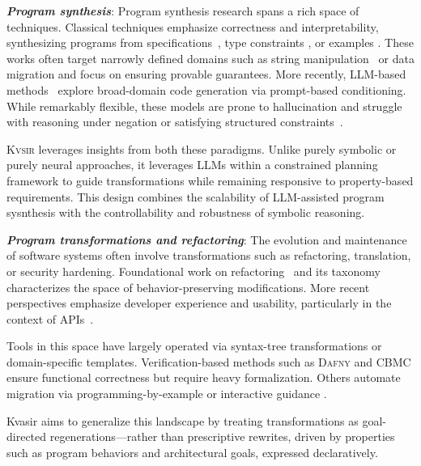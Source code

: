 \documentclass[sigplan]{acmart}
\newcommand{\sys}{{\scshape Kv{\textalpha}sir}\xspace}
\newcommand{\heading}[1]{\vspace{2pt}\noindent\textbf{\emph{#1}}:\enspace}
\begin{document}
\heading{Program synthesis}
Program synthesis research spans a rich space of techniques.
Classical techniques emphasize correctness and
interpretability, synthesizing programs from specifications~\cite{alur2013syntax, feser2015synthesizing, gulwani2011automating},
type constraints \cite{polikarpova2016program},
or examples \cite{jha2010oracle, raza2018disjunctive, singh2016blinkfill}.
These works often target narrowly
defined domains such as string manipulation~\cite{harp:ccs:2021} or data migration
\cite{yaghmazadeh2018automated} and focus on ensuring provable guarantees.
More recently, LLM-based methods~\cite{austin2021program, chen2021evaluating}
explore broad-domain code generation via prompt-based conditioning.
While remarkably flexible, these models are prone to hallucination and struggle
with reasoning under negation or satisfying structured constraints~\cite{xu2023llmfoolitselfpromptbased, wu2023deceptpromptexploitingllmdrivencode,jiang2024llmsdreamelephantswhen,hwang2024thinkpinkelephant}.

\sys leverages insights from both these paradigms.
Unlike purely symbolic or purely neural approaches, it leverages LLMs within a
constrained planning framework to guide transformations while remaining
responsive to property-based requirements.
This design combines
the scalability of LLM-assisted program sysnthesis with the controllability and robustness of symbolic
reasoning. %

\heading{Program transformations and refactoring}
The evolution and maintenance of software systems often involve transformations
such as refactoring, translation, or security hardening. Foundational work on
refactoring~\cite{Fowler99} and its taxonomy~\cite{Mens04} characterizes the
space of behavior-preserving modifications. More recent perspectives emphasize
developer experience and usability, particularly in the context of APIs~\cite{Myers16}.

Tools in this space have largely operated via syntax-tree transformations or
domain-specific templates. Verification-based methods such as \textsc{Dafny}
\cite{Leino10} and \textsc{CBMC} \cite{Clarke04} ensure functional correctness
but require heavy formalization.
Others automate migration via
programming-by-example or interactive guidance \cite{gulwani2017program, le2017interactive}.

Kvasir aims to generalize this landscape by treating transformations as
goal-directed regenerations---rather than prescriptive rewrites, driven by
properties such as program behaviors and architectural goals, expressed declaratively.
\end{document}
